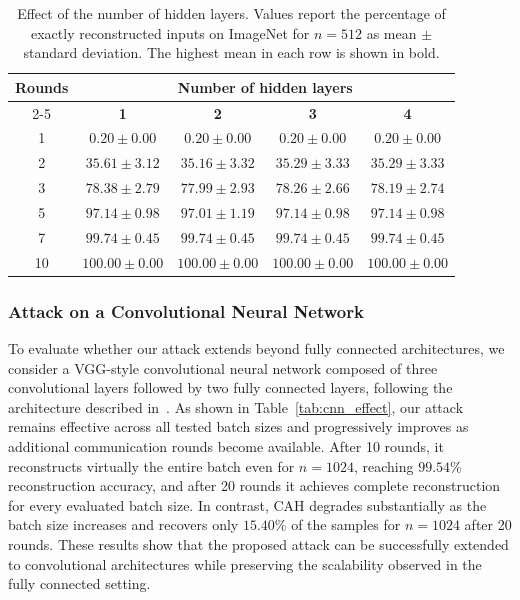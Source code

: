 \begin{table}[t]
    \centering
    \setlength{\tabcolsep}{8pt}
    \renewcommand{\arraystretch}{1.08}
    \caption{Effect of the number of hidden layers. Values report the percentage of exactly reconstructed inputs on ImageNet for $n=512$ as mean $\pm$ standard deviation. The highest mean in each row is shown in bold.}
    \label{tab:layers_effect}
    \begin{tabular}{@{}ccccc@{}}
        \toprule
        \textbf{Rounds} & \multicolumn{4}{c}{\textbf{Number of hidden layers}} \\
        \cmidrule(l){2-5}
        & \textbf{1} & \textbf{2} & \textbf{3} & \textbf{4} \\
        \midrule
        1  & $\mathbf{0.20} \pm 0.00$ & $\mathbf{0.20} \pm 0.00$
           & $\mathbf{0.20} \pm 0.00$ & $\mathbf{0.20} \pm 0.00$ \\
        2  & $\mathbf{35.61} \pm 3.12$ & $35.16 \pm 3.32$
           & $35.29 \pm 3.33$ & $35.29 \pm 3.33$ \\
        3  & $\mathbf{78.38} \pm 2.79$ & $77.99 \pm 2.93$
           & $78.26 \pm 2.66$ & $78.19 \pm 2.74$ \\
        5  & $\mathbf{97.14} \pm 0.98$ & $97.01 \pm 1.19$
           & $\mathbf{97.14} \pm 0.98$ & $\mathbf{97.14} \pm 0.98$ \\
        7  & $\mathbf{99.74} \pm 0.45$ & $\mathbf{99.74} \pm 0.45$
           & $\mathbf{99.74} \pm 0.45$ & $\mathbf{99.74} \pm 0.45$ \\
        10 & $\mathbf{100.00} \pm 0.00$ & $\mathbf{100.00} \pm 0.00$
           & $\mathbf{100.00} \pm 0.00$ & $\mathbf{100.00} \pm 0.00$ \\
        \bottomrule
    \end{tabular}
\end{table}

\subsubsection{Attack on a Convolutional Neural Network}

To evaluate whether our attack extends beyond fully connected architectures, we consider a VGG-style convolutional neural network composed of three convolutional layers followed by two fully connected layers, following the architecture described in~\cite[Table~9]{boenischWhenCuriousAbandon2023}. As shown in Table~\ref{tab:cnn_effect}, our attack remains effective across all tested batch sizes and progressively improves as additional communication rounds become available. After 10 rounds, it reconstructs virtually the entire batch even for $n=1024$, reaching $99.54\%$ reconstruction accuracy, and after 20 rounds it achieves complete reconstruction for every evaluated batch size. In contrast, CAH degrades substantially as the batch size increases and recovers only $15.40\%$ of the samples for $n=1024$ after 20 rounds. These results show that the proposed attack can be successfully extended to convolutional architectures while preserving the scalability observed in the fully connected setting.

